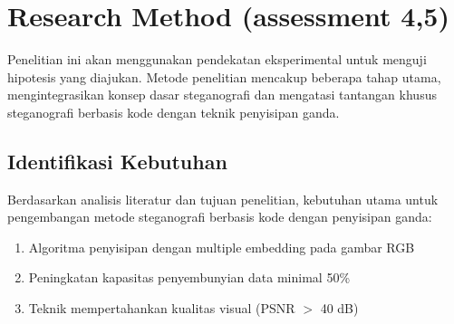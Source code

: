 \documentclass{ittelkom}
\begin{document}


\section{Research Method \color{red}(assessment 4,5)}
Penelitian ini akan menggunakan pendekatan eksperimental untuk menguji hipotesis yang diajukan. Metode penelitian mencakup beberapa tahap utama, mengintegrasikan konsep dasar steganografi dan mengatasi tantangan khusus steganografi berbasis kode dengan teknik penyisipan ganda.

\subsection{Identifikasi Kebutuhan}

Berdasarkan analisis literatur dan tujuan penelitian, kebutuhan utama untuk
pengembangan metode steganografi berbasis kode dengan penyisipan ganda:

\begin{enumerate}
    \item Algoritma penyisipan dengan multiple embedding pada gambar RGB
    \item Peningkatan kapasitas penyembunyian data minimal 50\%
    \item Teknik mempertahankan kualitas visual (PSNR $>$ 40 dB)
\end{enumerate}
\end{document}

